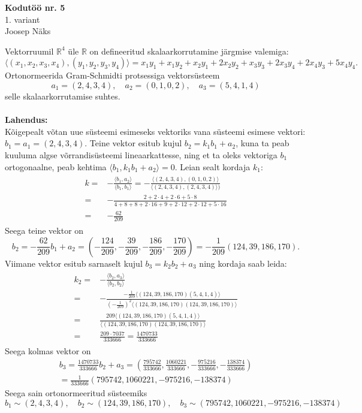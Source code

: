 \documentclass{article}
\begin{document}
\begin{center}
\Large\textbf{Kodutöö nr. 5}\\
1. variant\\
\small{Joosep Näks}
\end{center}
Vektorruumil $\mathbb{R}^4$ üle $\mathbb{R}$ on defineeritud skalaarkorrutamine järgmise valemiga: $$\langle(x_1,x_2,x_3,x_4),(y_1,y_2,y_3,y_4)\rangle=x_1y_1+x_1y_2+x_2y_1+2x_2y_2+x_3y_3+2x_3y_4+2x_4y_3+5x_4y_4.$$
Ortonormeerida Gram-Schmidti protsessiga vektorsüsteem $$a_1=(2,4,3,4),\quad a_2=(0,1,0,2),\quad a_3=(5,4,1,4)$$selle skalaarkorrutamise suhtes.\\\\
\textbf{Lahendus:}\\
Kõigepealt võtan uue süsteemi esimeseks vektoriks vana süsteemi esimese vektori: $b_1=a_1=(2,4,3,4)$. Teine vektor esitub kujul $b_2=k_1b_1+a_2$, kuna ta peab kuuluma algse võrrandisüsteemi lineaarkattesse, ning et ta oleks vektoriga $b_1$ ortogonaalne, peab kehtima $\langle b_1,k_1b_1+a_2\rangle=0$. Leian sealt kordaja $k_1$:
\begin{gather*}
\begin{aligned}
k=&-\frac{\langle b_1,a_2\rangle}{\langle b_1, b_1\rangle}=-\frac{\langle(2,4,3,4),(0,1,0,2)\rangle}{\langle(2,4,3,4),(2,4,3,4)\rangle)}\\
=&-\frac{2+2\cdot4+2\cdot6+5\cdot8}{4+8+8+2\cdot16+9+2\cdot12+2\cdot12+5\cdot16}\\
=&-\frac{62}{209}
\end{aligned}
\end{gather*}
Seega teine vektor on $$b_2=-\frac{62}{209}b_1+a_2=\left(-\frac{124}{209},-\frac{39}{209},-\frac{186}{209},-\frac{170}{209}\right)=-\frac{1}{209}(124,39,186,170).$$ Viimane vektor esitub sarnaselt kujul $b_3=k_2b_2+a_3$ ning kordaja saab leida:
\begin{gather*}
\begin{aligned}
k_2=&-\frac{\langle b_2,a_3\rangle}{\langle b_2,b_2\rangle}\\
=&-\frac{-\frac{1}{209}\langle(124,39,186,170)(5,4,1,4)\rangle}{\left(-\frac{1}{209}\right)^2\langle(124,39,186,170)(124,39,186,170)\rangle}\\
=&\frac{209\langle(124,39,186,170)(5,4,1,4)\rangle}{\langle(124,39,186,170)(124,39,186,170)\rangle}\\
=&\frac{209\cdot7037}{333666}=\frac{1470733}{333666}
\end{aligned}
\end{gather*}
Seega kolmas vektor on
\begin{gather*}
b_3=\frac{1470733}{333666}b_2+a_3=\left(\frac{795742}{333666},\frac{1060221}{333666},-\frac{975216}{333666},-\frac{138374}{333666}\right)\\
=\frac{1}{333666}(795742,1060221,-975216,-138374)
\end{gather*}
Seega sain ortonormeeritud süsteemiks$$b_1\sim(2,4,3,4),\quad b_2\sim(124,39,186,170),\quad b_3\sim(795742,1060221,-975216,-138374)$$
\end{document}
